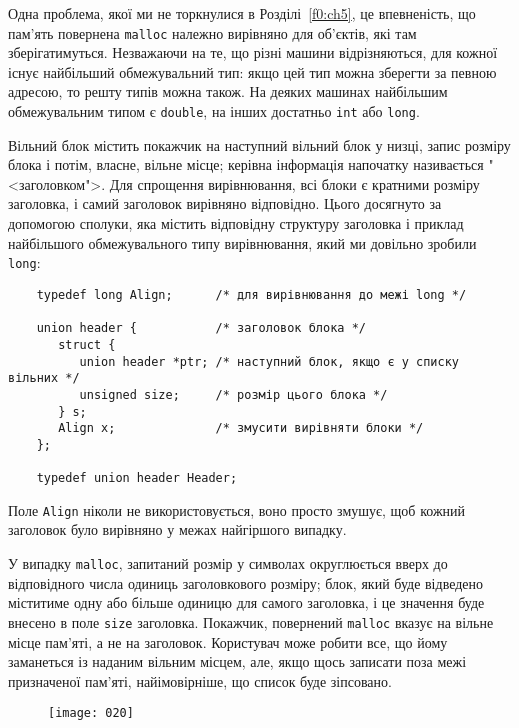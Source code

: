 \documentclass[a4paper,12pt]{book}
\begin{document}
  Одна проблема, якої ми не торкнулися в Розділі~\ref{f0:ch5}, це впевненість, що
  пам'ять повернена \texttt{malloc} належно вирівняно для об'єктів, які там
  зберігатимуться. Незважаючи на те, що різні машини відрізняються, для кожної існує
  найбільший обмежувальний тип: якщо цей тип можна зберегти за певною адресою, то решту
  типів можна також. На деяких машинах найбільшим обмежувальним типом є \texttt{double},
  на інших достатньо \texttt{int} або \texttt{long}.

  Вільний блок містить покажчик на наступний вільний блок у низці, запис розміру блока і
  потім, власне, вільне місце; керівна інформація напочатку називається
  "<заголовком">. Для спрощення вирівнювання, всі блоки є кратними розміру
  заголовка, і самий заголовок вирівняно відповідно. Цього досягнуто за допомогою сполуки,
  яка містить відповідну структуру заголовка і приклад найбільшого обмежувального типу
  вирівнювання, який ми довільно зробили \texttt{long}:
  \begin{verbatim}
    typedef long Align;      /* для вирівнювання до межі long */

    union header {           /* заголовок блока */
       struct {
          union header *ptr; /* наступний блок, якщо є у списку вільних */
          unsigned size;     /* розмір цього блока */
       } s;
       Align x;              /* змусити вирівняти блоки */
    };

    typedef union header Header;
  \end{verbatim}

  Поле \texttt{Align} ніколи не використовується, воно просто змушує, щоб кожний заголовок
  було вирівняно у межах найгіршого випадку.

  У випадку \texttt{malloc}, запитаний розмір у символах округлюється вверх до
  відповідного числа одиниць заголовкового розміру; блок, який буде відведено міститиме
  одну або більше одиницю для самого заголовка, і це значення буде внесено в поле
  \texttt{size} заголовка. Покажчик, повернений \texttt{malloc} вказує на вільне місце
  пам'яті, а не на заголовок. Користувач може робити все, що йому заманеться із наданим
  вільним місцем, але, якщо щось записати поза межі призначеної пам'яті, найімовірніше, що
  список буде зіпсовано.

%
  \begin{figure}[!htb]
  \centering
  \texttt{[image: 020]}
  \end{figure}
\end{document}
